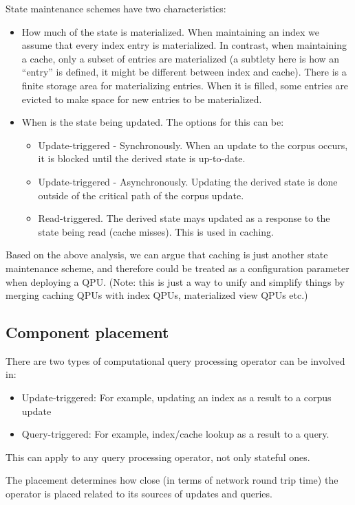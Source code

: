 State maintenance schemes have two characteristics:
\begin{itemize}
  \item How much of the state is materialized.
  When maintaining an index we assume that every index entry is materialized.
  In contrast, when maintaining a cache, only a subset of entries are
  materialized
  (a subtlety here is how an ``entry'' is defined, it might be different between
  index and cache).
  There is a finite storage area for materializing entries.
  When it is filled, some entries are evicted to make space for new entries to
  be materialized.
  \item When is the state being updated.
  The options for this can be:
  \begin{itemize}
    \item Update-triggered - Synchronously. When an update to the corpus
    occurs, it is blocked until the derived state is up-to-date.
    \item Update-triggered - Asynchronously. Updating the derived state is done
    outside of the critical path of the corpus update.
    \item Read-triggered. The derived state mays updated as a response to the
    state being read (cache misses).
    This is used in caching.
  \end{itemize}
\end{itemize}
  Based on the above analysis, we can argue that caching is just another state
  maintenance scheme, and therefore could be treated as a configuration
  parameter when deploying a QPU.
  (Note: this is just a way to unify and simplify things by merging caching
  QPUs with index QPUs, materialized view QPUs etc.)

\subsection{Component placement}
There are two types of computational query processing operator can be
involved in:
\begin{itemize}
  \item Update-triggered: For example, updating an index as a result to a corpus
  update
  \item Query-triggered: For example, index/cache lookup as a result to a query.
\end{itemize}
This can apply to any query processing operator, not only stateful ones.

The placement determines how close (in terms of network round trip time) the
operator is placed related to its sources of updates and queries.

